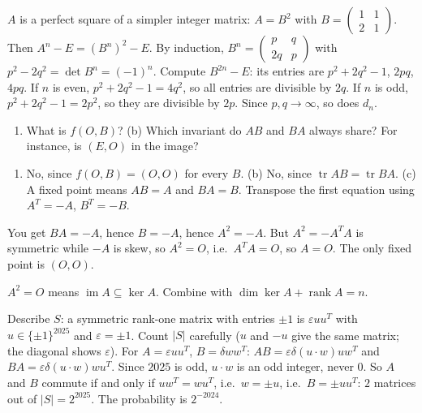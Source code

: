 \documentclass[11pt,a4paper]{article}
\begin{document}

\(A\) is a perfect square of a simpler integer matrix: \(A=B^2\) with \(B=\begin{pmatrix}1&1\\2&1\end{pmatrix}\). Then \(A^n-E=(B^n)^2-E\).
By induction, \(B^n=\begin{pmatrix}p&q\\2q&p\end{pmatrix}\) with \(p^2-2q^2=\det B^n=(-1)^n\). Compute \(B^{2n}-E\): its entries are \(p^2+2q^2-1\), \(2pq\), \(4pq\).
If \(n\) is even, \(p^2+2q^2-1=4q^2\), so all entries are divisible by \(2q\). If \(n\) is odd, \(p^2+2q^2-1=2p^2\), so they are divisible by \(2p\). Since \(p,q\to\infty\), so does \(d_n\).

\begin{enumerate}
\def\labelenumi{(\alph{enumi})}
\tightlist
\item
  What is \(f(O,B)\)? (b) Which invariant do \(AB\) and \(BA\) always share? For instance, is \((E,O)\) in the image?
\end{enumerate}
\begin{enumerate}
\def\labelenumi{(\alph{enumi})}
\tightlist
\item
  No, since \(f(O,B)=(O,O)\) for every \(B\). (b) No, since \(\operatorname{tr}AB=\operatorname{tr}BA\). (c) A fixed point means \(AB=A\) and \(BA=B\). Transpose the first equation using \(A^T=-A\), \(B^T=-B\).
\end{enumerate}
You get \(BA=-A\), hence \(B=-A\), hence \(A^2=-A\). But \(A^2=-A^TA\) is symmetric while \(-A\) is skew, so \(A^2=O\), i.e.~\(A^TA=O\), so \(A=O\). The only fixed point is \((O,O)\).

\(A^2=O\) means \(\operatorname{im}A\subseteq\ker A\). Combine with \(\dim\ker A+\operatorname{rank}A=n\).

Describe \(S\): a symmetric rank-one matrix with entries \(\pm1\) is \(\varepsilon uu^T\) with \(u\in\{\pm1\}^{2025}\) and \(\varepsilon=\pm1\). Count \(\lvert S\rvert\) carefully (\(u\) and \(-u\) give the same matrix; the diagonal shows \(\varepsilon\)).
For \(A=\varepsilon uu^T\), \(B=\delta ww^T\): \(AB=\varepsilon\delta(u\cdot w)uw^T\) and \(BA=\varepsilon\delta(u\cdot w)wu^T\). Since \(2025\) is odd, \(u\cdot w\) is an odd integer, never \(0\).
So \(A\) and \(B\) commute if and only if \(uw^T=wu^T\), i.e.~\(w=\pm u\), i.e.~\(B=\pm uu^T\): \(2\) matrices out of \(\lvert S\rvert=2^{2025}\). The probability is \(2^{-2024}\).
\end{document}
